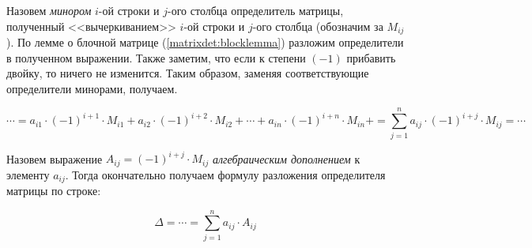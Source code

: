 Назовем \emph{минором} $i$-ой строки и $j$-ого столбца определитель
матрицы, полученный <<вычеркиванием>> $i$-ой строки и $j$-ого столбца
(обозначим за $M_{ij}$). По лемме о блочной матрице
(\ref{matrixdet:blocklemma}) разложим определители в полученном
выражении. Также заметим, что если к степени $(-1)$ прибавить двойку, то
ничего не изменится. Таким образом, заменяя соответствующие определители
минорами, получаем.

$$
\cdots=
a_{i1}\cdot(-1)^{i+1}\cdot M_{i1} +
a_{i2}\cdot(-1)^{i+2}\cdot M_{i2} +
\cdots                            +
a_{in}\cdot(-1)^{i+n}\cdot M_{in} +
=
\sum_{j=1}^n a_{ij}\cdot(-1)^{i+j}\cdot M_{ij}
=\cdots
$$

Назовем выражение $A_{ij}=(-1)^{i+j}\cdot M_{ij}$ \emph{алгебраическим
дополнением} к элементу $a_{ij}$. Тогда окончательно получаем формулу
разложения определителя матрицы по строке:

$$
\Delta = \cdots = \sum_{j=1}^n a_{ij}\cdot A_{ij}
$$



